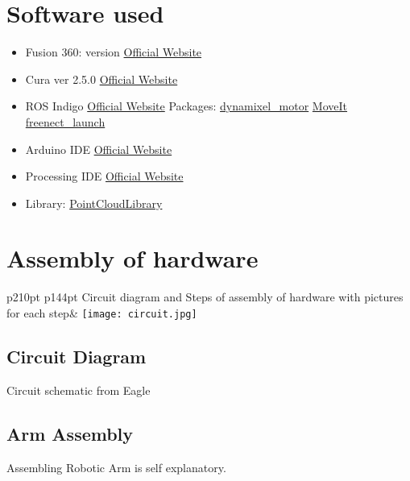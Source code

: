 \documentclass[a4paper,12pt,oneside]{book}
\newcommand\tab[1][1cm]{\hspace*{#1}}
\begin{document}
	\section{Software used}
	\begin{itemize}
		\item Fusion 360: version
		\href{https://www.autodesk.com/products/fusion-360/overview}{Official Website} 
		\item Cura ver 2.5.0
		\href{https://ultimaker.com/en/products/cura-software}{Official Website}
		\item ROS Indigo
		\href{https://www.ros.org}{Official Website}
		\newline
		\tab Packages:
		\newline
		\tab \tab \href{http://wiki.ros.org/dynamixel_motor}{dynamixel\_motor}
		\newline
		\tab \tab \href{http://moveit.ros.org/}{MoveIt}
		\newline
		\tab \tab \href{http://wiki.ros.org/freenect_launch}{freenect\_launch}
		\item Arduino IDE
		\href{https://www.arduino.cc}{Official Website}
		\item Processing IDE
		\href{https://www.processing.org}{Official Website}
		\item Library: 
		\href{http://pointclouds.org}{PointCloudLibrary}
	\end{itemize}
	
	\section{Assembly of hardware}

	\begin{tabular} { p{210pt} p{144pt} }
		Circuit diagram and Steps of assembly of hardware with pictures for each step&
		 {\texttt{[image: circuit.jpg]}} \\
		\subsection*{Circuit Diagram}
		Circuit schematic from Eagle
		\subsection*{Arm Assembly}
		Assembling Robotic Arm is self explanatory.
	\end{tabular}
	
\end{document}
